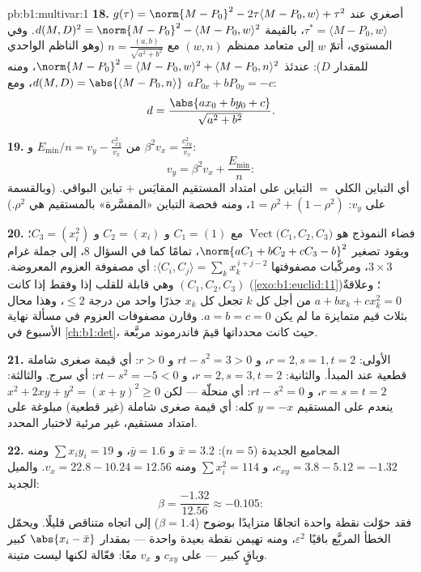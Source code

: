 \begin{solution}{pb:b1:multivar:1}
\textbf{18.} $g(\tau) = \norm{M - P_0}^2 - 2\tau\langle M - P_0,
w\rangle + \tau^2$ أصغري عند $\tau^* = \langle M - P_0,
w\rangle$، بالقيمة $d(M,D)^2 = \norm{M - P_0}^2 - \langle M -
P_0, w\rangle^2$. وفي المستوي، أتمّ $w$ إلى  متعامد
ممنظم $(w, n)$ مع $n = \frac{(a, b)}{\sqrt{a^2+b^2}}$ (وهو الناظم
الواحدي للمقدار $D$): عندئذ $\norm{M - P_0}^2 = \langle M - P_0,
w\rangle^2 + \langle M - P_0, n\rangle^2$، ومنه $d(M, D) =
\abs{\langle M - P_0, n\rangle}$، ومع $aP_{0x} + bP_{0y} =
-c$:
\[
d = \frac{\abs{a x_0 + b y_0 + c}}{\sqrt{a^2 + b^2}} .
\]

\textbf{19.} من $E_{\min}/n = v_y - \frac{c_{xy}^2}{v_x}$ و
$\beta^2 v_x = \frac{c_{xy}^2}{v_x}$:
\[
v_y = \beta^2 v_x + \frac{E_{\min}}n :
\]
أي التباين الكلي $=$ التباين على امتداد المستقيم المقايَس $+$ تباين
البواقي. (وبالقسمة على $v_y$: $1 = \rho^2 + (1 - \rho^2)$، ومنه فحصة
التباين «المفسَّرة» بالمستقيم هي $\rho^2$.)

\textbf{20.} فضاء النموذج هو
$\operatorname{Vect}\bigl(C_1, C_2, C_3\bigr)$ مع $C_1 = (1)$ و
$C_2 = (x_i)$ و $C_3 = (x_i^2)$؛ ويقود تصغير $\norm{aC_1 + bC_2 +
cC_3 - b}^2$، تمامًا كما في السؤال 8، إلى جملة غرام
$3\times3$، ومركّبات مصفوفتها $\langle C_i, C_j\rangle =
\sum_k x_k^{\,i+j-2}$: أي مصفوفة العزوم المعروضة. وهي
قابلة للقلب إذا وفقط إذا كانت $(C_1, C_2, C_3)$ 
(\cref{exo:b1:euclid:11})؛ وعلاقةٌ $a + bx_k + cx_k^2 = 0$
من أجل كل $k$ تجعل كل $x_k$ جذرًا  واحد
من درجة $\leq 2$، وهذا محال بثلاث قيم متمايزة ما لم يكن $a
= b = c = 0$. وقارن مصفوفات العزوم في مسألة نهاية الأسبوع
في \cref{ch:b1:det}، حيث كانت محدداتها قيمَ فاندرموند
مربَّعة.

\textbf{21.} الأولى: $r = 2, s = 1, t = 2$، و $rt - s^2 = 3 > 0$ و
$r > 0$: أي قيمة صغرى شاملة قطعية عند المبدأ. والثانية: $r = 2, s
= 3, t = 2$، و $rt - s^2 = -5 < 0$: أي سرج. والثالثة: $r = s = t =
2$، و $rt - s^2 = 0$: أي منحلّة --- لكن $x^2 + 2xy + y^2 = (x +
y)^2 \geq 0$ ينعدم على المستقيم $y = -x$ كله: أي قيمة صغرى
شاملة (غير قطعية) مبلوغة على امتداد مستقيم، غير مرئية
لاختبار المحدد.

\textbf{22.} المجاميع الجديدة ($n = 5$): $\bar x = 3.2$ و $\bar y =
1.6$، و $\sum x_iy_i = 19$ ومنه $c_{xy} = 3.8 - 5.12 = -1.32$،
و $\sum x_i^2 = 114$ ومنه $v_x = 22.8 - 10.24 = 12.56$. والميل الجديد:
\[
\beta = \frac{-1.32}{12.56} \approx -0.105 :
\]
فقد حوّلت نقطة واحدة اتجاهًا متزايدًا بوضوح ($\beta = 1.4$) إلى
اتجاه متناقص قليلًا. ويحمّل الخطأ المربَّع باقيًا
$\varepsilon^2$، ومنه تهيمن نقطة بعيدة واحدة --- بمقدار
$\abs{x_{i} - \bar x}$ كبير \emph{و}باقٍ كبير ---
على $c_{xy}$ و $v_x$ معًا:  فعّالة لكنها ليست
متينة.


\end{solution}
